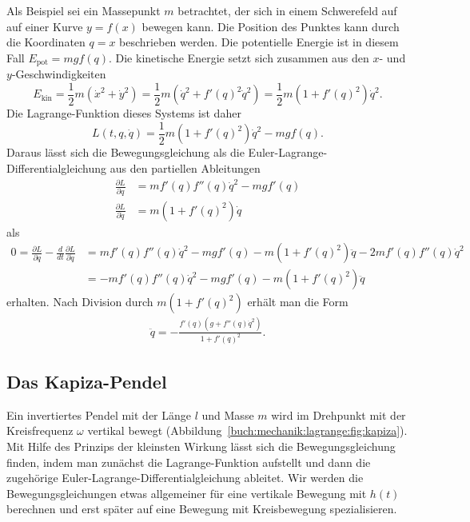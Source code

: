 Als Beispiel sei ein Massepunkt $m$ betrachtet, der sich in einem
Schwerefeld auf auf einer Kurve $y=f(x)$ bewegen kann.
Die Position des Punktes kann durch die Koordinaten $q=x$ beschrieben
werden.
Die potentielle Energie ist in diesem Fall $E_{\text{pot}} = mgf(q)$.
Die kinetische Energie setzt sich zusammen aus den $x$- und
$y$-Geschwindigkeiten
\[
E_{\text{kin}}
=
\frac12m(\dot{x}^2 + \dot{y}^2)
=
\frac12m(\dot{q}^2 + f'(q)^2 \dot{q}^2)
=
\frac12m(1+f'(q)^2)\dot{q}^2.
\]
Die Lagrange-Funktion dieses Systems ist daher 
\[
L(t,q,\dot{q})
=
\frac12m(1+f'(q)^2)\dot{q}^2 - mgf(q).
\]
Daraus lässt sich die Bewegungsgleichung als die
Euler-Lagrange-Differentialgleichung aus den partiellen Ableitungen
\begin{align*}
\frac{\partial L}{\partial q}
&=
mf'(q)f''(q)\dot{q}^2 - mgf'(q)
\\
\frac{\partial L}{\partial\dot{q}}
&=
m(1+f'(q)^2)\dot{q}
\end{align*}
als
\begin{align*}
0
=
\frac{\partial L}{\partial q}-\frac{d}{dt}\frac{\partial L}{\partial\dot{q}}
&=
mf'(q)f''(q)\dot{q}^2
-
mgf'(q)
-
m(1+f'(q)^2)\ddot{q}
-
2mf'(q)f''(q)\dot{q}^2
\\
&=
-
mf'(q)f''(q)\dot{q}^2
-
mgf'(q)
-
m(1+f'(q)^2)\ddot{q}
\end{align*}
erhalten.
Nach Division durch $m(1+f'(q)^2)$ erhält man die Form
\begin{align*}
\ddot{q}
=
-
\frac{f'(q)(g+f''(q)\dot{q}^2)}{1+f'(q)^2}.
\end{align*}


%
%
\subsection{Das Kapiza-Pendel}
Ein invertiertes Pendel mit der Länge $l$ und Masse $m$ wird im
Drehpunkt mit der Kreisfrequenz $\omega$ vertikal bewegt
(Abbildung~\ref{buch:mechanik:lagrange:fig:kapiza}).
Mit Hilfe des Prinzips der kleinsten Wirkung lässt sich die
Bewegungsgleichung finden, indem man zunächst die Lagrange-Funktion
aufstellt und dann die zugehörige Euler-Lagrange-Differentialgleichung
ableitet.
Wir werden die Bewegungsgleichungen etwas allgemeiner für eine
vertikale Bewegung mit $h(t)$ berechnen und erst später auf eine
Bewegung mit Kreisbewegung spezialisieren.

